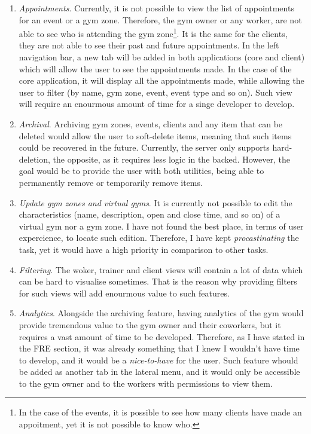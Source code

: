 \documentclass[a4paper, 12pt, oneside]{book}
\begin{document}
\begin{enumerate}[label = -]
	\item \emph{Appointments}. Currently, it is not possible to view the list of appointments for an event or a gym zone. Therefore, the gym owner or any worker, are not able to see who is attending the gym zone\footnote{In the case of the events, it is possible to see how many clients have made an appoitment, yet it is not possible to know who.}. It is the same for the clients, they are not able to see their past and future appointments.
	      \newline
	      In the left navigation bar, a new tab will be added in both applications (core and client) which will allow the user to see the appointments made. In the case of the core application, it will display all the appointments made, while allowing the user to filter (by name, gym zone, event, event type and so on). Such view will require an enourmous amount of time for a singe developer to develop.
	\item \emph{Archival}. Archiving gym zones, events, clients and any item that can be deleted would allow the user to soft-delete items, meaning that such items could be recovered in the future. Currently, the server only supports hard-deletion, the opposite, as it requires less logic in the backed. However, the goal would be to provide the user with both utilities, being able to permanently remove or temporarily remove items.
	\item \emph{Update gym zones and virtual gyms}. It is currently not possible to edit the characteristics (name, description, open and close time, and so on) of a virtual gym nor a gym zone. I have not found the best place, in terms of user expercience, to locate such edition. Therefore, I have kept \emph{procastinating} the task, yet it would have a high priority in comparison to other tasks.
	\item \emph{Filtering}. The woker, trainer and client views will contain a lot of data which can be hard to visualise sometimes. That is the reason why providing filters for such views will add enourmous value to such features.
	\item \emph{Analytics}. Alongside the archiving feature, having analytics of the gym would provide tremendous value to the gym owner and their coworkers, but it requires a vast amount of time to be developed. Therefore, as I have stated in the FRE section, it was already something that I knew I wouldn't have time to develop, and it would be a \emph{nice-to-have} for the user. Such feature whould be added as another tab in the lateral menu, and it would only be accessible to the gym owner and to the workers with permissions to view them.

\end{enumerate}
\end{document}
